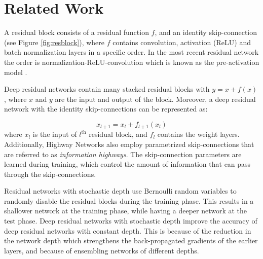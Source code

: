 \documentclass[journal]{IEEEtran}
\begin{document}



\section{Related Work}\label{sec2}

A residual block consists of a residual function $f$, and an identity skip-connection (see Figure \ref{fig:resblock}), where $f$ contains convolution, activation (ReLU) and batch normalization  \cite{ioffe2015batch} layers in a specific order. In the most recent residual network the order is normalization-ReLU-convolution which is known as the pre-activation model \cite{he2016identity}.


Deep residual networks contain many stacked residual blocks with $y = x + f(x)$, where $x$ and $y$ are the input and output of the block. Moreover, a deep residual network with the identity skip-connections \cite{he2016identity} can be represented as:

\begin{equation}\label{iresnet}
x_{l+1} = x_l+f_{l+1}(x_l)
\end{equation}
where $x_l$ is the input of $l^{\text{th}}$ residual block, and $f_l$ contains the weight layers. Additionally, Highway Networks \cite{srivastava2015training,srivastava2015highway} also employ parametrized skip-connections that are referred to as \textit{information highways}. The skip-connection parameters are learned during training, which control the amount of information that can pass through the skip-connections.




Residual networks with stochastic depth \cite{huang2016deep} use Bernoulli random variables to randomly disable the residual blocks during the training phase. This results in a shallower network at the training phase, while having a deeper network at the test phase. Deep residual networks with stochastic depth improve the accuracy of deep residual networks with constant depth. This is because of the reduction in the network depth which strengthens the back-propagated gradients of the earlier layers, and because of ensembling networks of different depths.
\end{document}
